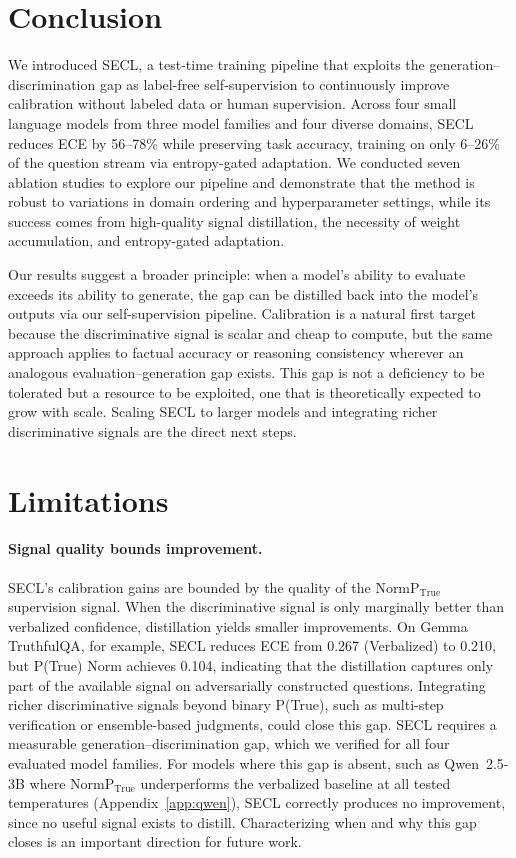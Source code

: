 \documentclass[11pt]{article}
\begin{document}
\section{Conclusion} \label{sec:conclusion}

We introduced SECL, a test-time training pipeline that exploits the generation--discrimination gap as label-free self-supervision to continuously improve calibration without labeled data or human supervision. Across four small language models from three model families and four diverse domains, SECL reduces ECE by 56--78\% while preserving task accuracy, training on only 6--26\% of the question stream via entropy-gated adaptation. We conducted seven ablation studies to explore our pipeline and demonstrate that the method is robust to variations in domain ordering and hyperparameter settings, while its success comes from high-quality signal distillation, the necessity of weight accumulation, and entropy-gated adaptation.

Our results suggest a broader principle: when a model's ability to evaluate exceeds its ability to generate, the gap can be distilled back into the model's outputs via our self-supervision pipeline. Calibration is a natural first target because the discriminative signal is scalar and cheap to compute, but the same approach applies to factual accuracy or reasoning consistency wherever an analogous evaluation--generation gap exists. This gap \cite{kalai_why_2025} is not a deficiency to be tolerated but a resource to be exploited, one that is theoretically expected to grow with scale. Scaling SECL to larger models and integrating richer discriminative signals are the direct next steps.

\clearpage
\section*{Limitations} \label{sec:limitations}

\paragraph{Signal quality bounds improvement.}
SECL's calibration gains are bounded by the quality of the NormP$_{\text{True}}$ supervision signal. When the discriminative signal is only marginally better than verbalized confidence, distillation yields smaller improvements. On Gemma TruthfulQA, for example, SECL reduces ECE from 0.267 (Verbalized) to 0.210, but P(True) Norm achieves 0.104, indicating that the distillation captures only part of the available signal on adversarially constructed questions. Integrating richer discriminative signals beyond binary P(True), such as multi-step verification or ensemble-based judgments, could close this gap. SECL requires a measurable generation--discrimination gap, which we verified for all four evaluated model families. For models where this gap is absent, such as Qwen~2.5-3B \cite{qwen_qwen25_2025} where NormP$_{\text{True}}$ underperforms the verbalized baseline at all tested temperatures (Appendix~\ref{app:qwen}), SECL correctly produces no improvement, since no useful signal exists to distill. Characterizing when and why this gap closes is an important direction for future work.
\end{document}
